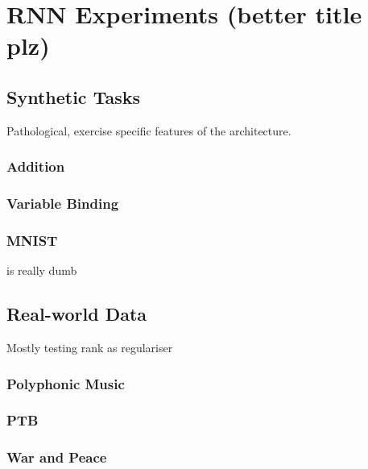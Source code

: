 \chapter{RNN Experiments (better title plz)}\label{C:exps}
\section{Synthetic Tasks}
Pathological, exercise specific features of the architecture.
\subsection{Addition}
\subsection{Variable Binding}
\subsection{MNIST}
is really dumb

\section{Real-world Data}
Mostly testing rank as regulariser
\subsection{Polyphonic Music}
\subsection{PTB}
\subsection{War and Peace}